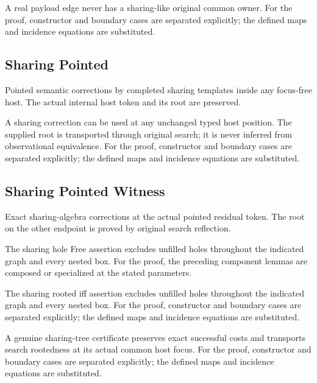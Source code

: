 A real payload edge never has a sharing-like original common owner.
For the proof, constructor and boundary cases are separated explicitly; the defined maps and incidence equations are substituted.
\par{}

\subsection{Sharing Pointed}
Pointed semantic corrections by completed sharing templates inside any focus-free host. The actual internal host token and its root are preserved.

A sharing correction can be used at any unchanged typed host position. The supplied root is transported through original search; it is never inferred from observational equivalence.
For the proof, constructor and boundary cases are separated explicitly; the defined maps and incidence equations are substituted.
\par{}

\subsection{Sharing Pointed Witness}
Exact sharing-algebra corrections at the actual pointed residual token. The root on the other endpoint is proved by original search reflection.

The sharing hole Free assertion excludes unfilled holes throughout the indicated graph and every nested box.
For the proof, the preceding component lemmas are composed or specialized at the stated parameters.
\par{}

The sharing rooted iff assertion excludes unfilled holes throughout the indicated graph and every nested box.
For the proof, constructor and boundary cases are separated explicitly; the defined maps and incidence equations are substituted.
\par{}

A genuine sharing-tree certificate preserves exact successful costs and transports search rootedness at its actual common host focus.
For the proof, constructor and boundary cases are separated explicitly; the defined maps and incidence equations are substituted.
\par{}

